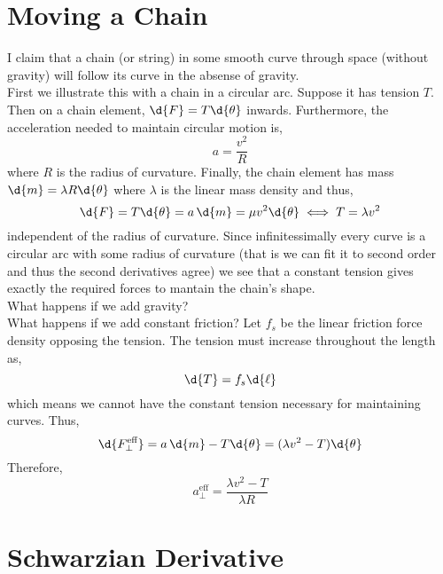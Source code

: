 \documentclass[12pt]{article}
\begin{document}
\section{Moving a Chain}

I claim that a chain (or string) in some smooth curve through space (without gravity) will follow its curve in the absense of gravity. 
\bigskip\\
First we illustrate this with a chain in a circular arc. Suppose it has tension $T$. Then on a chain element, $\d{F} = T \d{\theta}$ inwards. Furthermore, the acceleration needed to maintain circular motion is,
\[ a = \frac{v^2}{R} \]
where $R$ is the radius of curvature. Finally, the chain element has mass $\d{m} = \lambda R \d{\theta}$ where $\lambda$ is the linear mass density and thus,
\[ \d{F} = T \d{\theta} = a \, \d{m} = \mu v^2 \d{\theta} \iff T = \lambda v^2 \]
independent of the radius of curvature. Since infinitessimally every curve is a circular arc with some radius of curvature (that is we can fit it to second order and thus the second derivatives agree) we see that a constant tension gives exactly the required forces to mantain the chain's shape. 
\bigskip\\
What happens if we add gravity? 
\bigskip\\
What happens if we add constant friction? Let $f_s$ be the linear friction force density opposing the tension. The tension must increase throughout the length as,
\[ \d{T} = f_s \d{\ell} \]
which means we cannot have the constant tension necessary for maintaining curves. Thus,
\[ \d{F_{\perp}^{\text{eff}}} = a \, \d{m} - T \d{\theta} =  (\lambda v^2 - T) \d{\theta} \]
Therefore,
\[ a_\perp^{\text{eff}} = \frac{\lambda v^2 - T}{\lambda R} \]

\section{Schwarzian Derivative}
\end{document}
